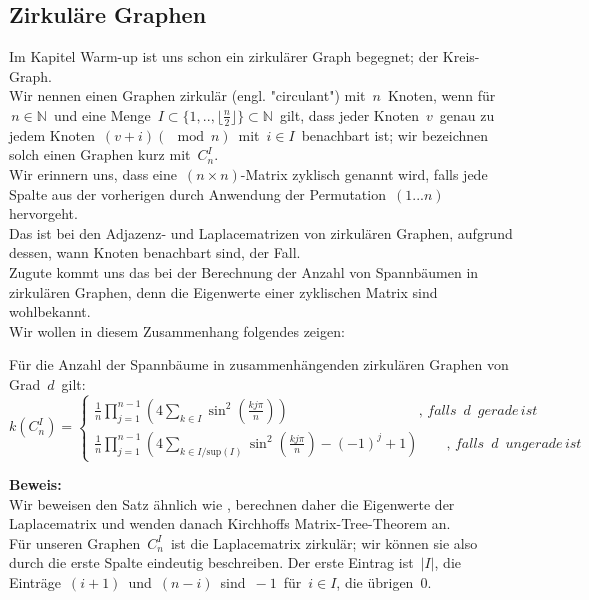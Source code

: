 \subsection{Zirkuläre Graphen}
Im Kapitel Warm-up ist uns schon ein zirkulärer Graph begegnet; der Kreis-Graph.\\
Wir nennen einen Graphen zirkulär (engl. "circulant") mit $\,n\,$ Knoten, wenn für $\,n \in \mathbb{N}\,$ und eine Menge $\,I \subset{\{1,..,\lfloor \frac{n}{2} \rfloor \}}\subset{\mathbb{N}}\,$ gilt, dass jeder Knoten $\,v\,$ genau zu jedem Knoten $\,(v+i) (\mod{n})\,$ mit $\,i \in I\,$ benachbart ist; wir bezeichnen solch einen Graphen kurz mit $\,C_n^I$.\;\\
Wir erinnern uns, dass eine $\,(n\times n)$-Matrix zyklisch genannt wird, falls jede Spalte aus der vorherigen durch Anwendung der Permutation $\,(1...n)\,$ hervorgeht.\\
Das ist bei den Adjazenz- und Laplacematrizen von zirkulären Graphen, aufgrund dessen, wann Knoten benachbart sind, der Fall.\\
Zugute kommt uns das bei der Berechnung der Anzahl von Spannbäumen in zirkulären Graphen, denn die Eigenwerte einer zyklischen Matrix sind wohlbekannt.\\
Wir wollen in diesem Zusammenhang folgendes zeigen:
\begin{Tms}
Für die Anzahl der Spannbäume in zusammenhängenden zirkulären Graphen von Grad $\,d\,$ gilt:\\
\begin{equation*}
\mathit{k}\left( C_n^I \right) = 
 \begin{cases}
\frac{1}{n} \prod_{j=1}^{n-1} \left(4 \sum_{k \in I} \sin^2 \left( \frac{kj\pi}{n}\right) \right)\qquad\qquad\qquad\qquad\quad\; ,\,falls\,\,\,d\,\,\,gerade\,ist\\
\frac{1}{n} \prod_{j=1}^{n-1} \left(4 \sum_{k \in I/\mathrm{sup}(I)} \sin^2 \left( \frac{kj\pi}{n}\right)-(-1)^j+1\right)\qquad,\,falls\,\,\,d\,\,\,ungerade\,ist
\end{cases}
\end{equation*}
\label{tmc}
\end{Tms}
\textbf{Beweis:}\\
Wir beweisen den Satz ähnlich wie \cite{wang_yang_1984}, berechnen daher die Eigenwerte der Laplacematrix und wenden danach Kirchhoffs Matrix-Tree-Theorem an.\\
Für unseren Graphen $\,C_n^I\,$ ist die Laplacematrix zirkulär; wir können sie also durch die erste Spalte eindeutig beschreiben. Der erste Eintrag ist $\,|I|$,\; die Einträge $\,(i+1)\,$  und $\,(n-i)\,$ sind $\,-1\,$ für $\,i \in I$,\; die übrigen $\,0$.\;\\
